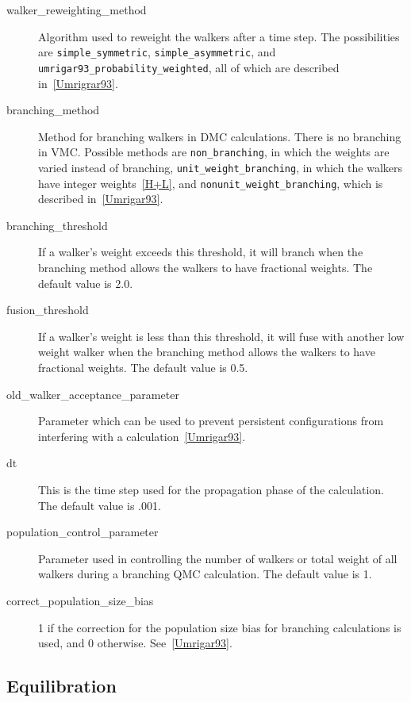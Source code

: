 \documentclass{article}
\begin{document}
\begin{description}
\item [walker\_reweighting\_method] Algorithm used to reweight the
  walkers after a time step.  The possibilities are
  \verb-simple_symmetric-, \verb-simple_asymmetric-, and
  \verb-umrigar93_probability_weighted-, all of which are described
  in~\ref{Umrigrar93}. 

\item [branching\_method] Method for branching walkers in DMC
  calculations.  There is no branching in VMC.  Possible
  methods are \verb-non_branching-, in which the weights are varied
  instead of branching, \verb-unit_weight_branching-, in which the
  walkers have integer weights~\ref{H+L}, and
  \verb-nonunit_weight_branching-, which is described
  in~\ref{Umrigar93}.   

\item [branching\_threshold] If a walker's weight exceeds this
  threshold, it will branch when the branching method allows the
  walkers to have fractional weights.  The default value is 2.0.

\item [fusion\_threshold] If a walker's weight is less than this
  threshold, it will fuse with another low weight walker when the
  branching method allows the walkers to have fractional weights.  The
  default value is 0.5.

\item [old\_walker\_acceptance\_parameter] Parameter which can be
  used to prevent persistent configurations from interfering with a
  calculation~\ref{Umrigar93}.

\item [dt] This is the time step used for the propagation phase
  of the calculation.  The default value is .001.

\item [population\_control\_parameter] Parameter used in
  controlling the number of walkers or total weight of all walkers
  during a branching QMC calculation.  The default value is 1.

\item [correct\_population\_size\_bias] 1 if the correction for the
  population size bias for branching calculations is used, and 0
  otherwise. See~\ref{Umrigar93}.

\end{description}

\subsection{Equilibration}
\end{document}

